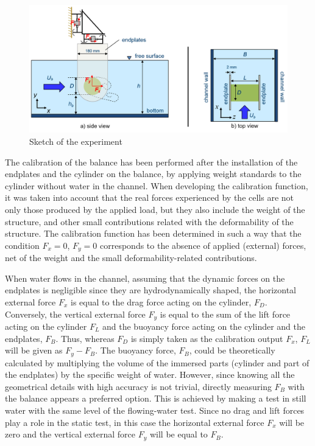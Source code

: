\documentclass[12pt]{article}
\begin{document}
        \begin{figure}[ht!]
                \centering
                \includegraphics[width=\textwidth]{Setup.png}
                \caption{Sketch of the experiment}
                \label{fig:reference}
        \end{figure}

        The calibration of the balance has been performed after the installation of the endplates and the cylinder on the balance, by applying weight standards to the cylinder without water in the channel. When developing the calibration function, it was taken into account that the real forces experienced by the cells are not only those produced by the applied load, but they also include the weight of the structure, and other small contributions related with the deformability of the structure. The calibration function has been determined in such a way that the condition $F_x=0$, $F_y=0$ corresponds to the absence of applied (external) forces, net of the weight and the small deformability-related contributions.

        When water flows in the channel, assuming that the dynamic forces on the endplates is negligible since they are hydrodynamically shaped, the horizontal external force $F_x$ is equal to the drag force acting on the cylinder, $F_D$. Conversely, the vertical external force $F_y$ is equal to the sum of the lift force acting on the cylinder $F_L$ and the buoyancy force acting on the cylinder and the endplates, $F_B$. Thus, whereas $F_D$ is simply taken as the calibration output $F_x$, $F_L$ will be given as $F_y - F_B$. The buoyancy force, $F_B$, could be theoretically calculated by multiplying the volume of the immersed parts (cylinder and part of the endplates) by the specific weight of water. However, since knowing all the geometrical details with high accuracy is not trivial, directly measuring $F_B$ with the balance appears a preferred option. This is achieved by making a test in still water with the same level of the flowing-water test. Since no drag and lift forces play a role in the static test, in this case the horizontal external force $F_x$ will be zero and the vertical external force $F_y$ will be equal to $F_B$.
\end{document}

